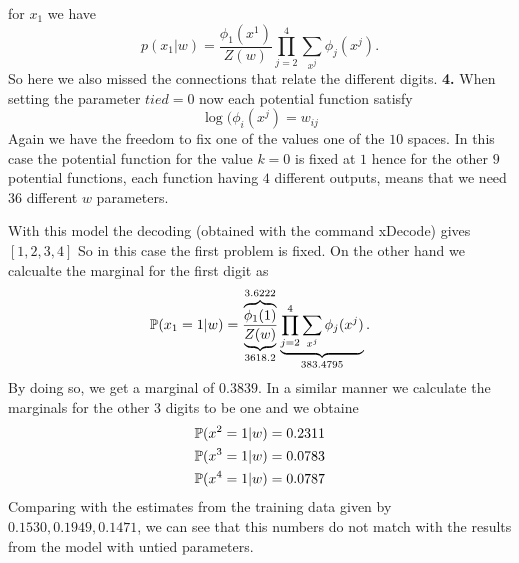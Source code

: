 \documentclass{article}
\begin{document}
for $x_{1}$ we have
\begin{equation*}
p(x_{1}|w)=\frac{\phi_{1}(x^{1})}{Z(w)}\prod_{j=2}^{4}\sum_{x^{j}}\phi_{j}(x^{j}).
\end{equation*}
So here we also missed the connections that relate the different digits.
\newline
\newline
\textbf{4.}
\newline
When setting the parameter $tied=0$ now each potential function satisfy
\begin{equation*}
\log(\phi_{i}(x^{j})=w_{ij}
\end{equation*}
Again we have the freedom to fix one of the values one of the $10$ spaces. In this case the potential
function for the value $k=0$ is fixed at $1$ hence for the other $9$ potential functions, each function
having $4$ different outputs, means that we need 36 different $w$ parameters.

With this model the decoding (obtained with the command xDecode) gives $[1,2,3,4]$ So in this case
the first problem is fixed. On the other hand we calcualte the marginal for the first digit as 
\begin{equation*}
\mathbb{P}(x_{1}=1|w)=\frac{\overbrace{\phi_{1}(1)}^{3.6222}}{\underbrace{Z(w)}_{3618.2}}\underbrace{\prod_{j=2}^{4}\sum_{x^{j}}\phi_{j}(x^{j})}_{383.4795}.
\end{equation*}
By doing so, we get a marginal of $0.3839$. In a similar manner we calculate the marginals for the other 3 digits to be one and we obtaine
\begin{align*}
\mathbb{P}(x^{2}=1|w)=0.2311 \\
\mathbb{P}(x^{3}=1|w)= 0.0783\\
\mathbb{P}(x^{4}=1|w)=0.0787 \\
\end{align*}
Comparing with the estimates from the training data given by $0.1530,0.1949,0.1471$, we can see that this numbers do not match
with the results from the model with untied parameters.
\end{document}
